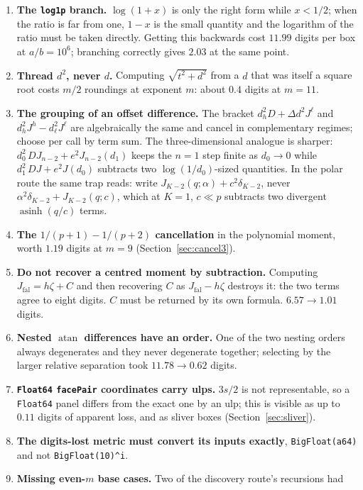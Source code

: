 \documentclass[11pt]{article}
\theoremstyle{remark}
\newcommand{\asinh}{\operatorname{asinh}}
\newcommand{\atan}{\operatorname{atan}}
\newcommand{\code}[1]{\texttt{#1}}
\begin{document}
\begin{enumerate}[nosep]
\item \textbf{The \code{log1p} branch.} $\log(1+x)$ is only the right form while
$x < 1/2$; when the ratio is far from one, $1-x$ is the small quantity and the logarithm
of the ratio must be taken directly. Getting this backwards cost $11.99$ digits per box at
$a/b = 10^6$; branching correctly gives $2.03$ at the same point.
\item \textbf{Thread $d^2$, never $d$.} Computing $\sqrt{t^2+d^2}$ from a $d$ that was
itself a square root costs $m/2$ roundings at exponent $m$: about $0.4$ digits at
$m = 11$.
\item \textbf{The grouping of an offset difference.} The bracket
$d_h^2 D + \Delta d^2 J^{\ell}$ and $d_h^2 J^h - d_\ell^2 J^{\ell}$ are algebraically the
same and cancel in complementary regimes; choose per call by term sum. The
three-dimensional analogue is sharper: $d_0^2\,DJ_{n-2} + e^2 J_{n-2}(d_1)$ keeps the
$n = 1$ step finite as $d_0\to0$ while $d_1^2\,DJ + e^2 J(d_0)$ subtracts two
$\log(1/d_0)$-sized quantities. In the polar route the same trap reads: write
$J_{K-2}(q;\alpha) + c^2\delta_{K-2}$, never $\alpha^2\delta_{K-2} + J_{K-2}(q;c)$, which
at $K = 1$, $c \ll p$ subtracts two divergent $\asinh(q/c)$ terms.
\item \textbf{The $1/(p+1) - 1/(p+2)$ cancellation} in the polynomial moment, worth
$1.19$ digits at $m = 9$ (Section~\ref{sec:cancel3}).
\item \textbf{Do not recover a centred moment by subtraction.} Computing
$J_{\mathrm{fal}} = h\zeta + C$ and then recovering $C$ as $J_{\mathrm{fal}} - h\zeta$
destroys it: the two terms agree to eight digits. $C$ must be returned by its own formula.
$6.57 \to 1.01$ digits.
\item \textbf{Nested $\atan$ differences have an order.} One of the two nesting orders
always degenerates and they never degenerate together; selecting by the larger relative
separation took $11.78 \to 0.62$ digits.
\item \textbf{\code{Float64} \code{facePair} coordinates carry ulps.} $3s/2$ is not
representable, so a \code{Float64} panel differs from the exact one by an ulp; this is
visible as up to $0.11$ digits of apparent loss, and as sliver boxes
(Section~\ref{sec:sliver}).
\item \textbf{The digits-lost metric must convert its inputs exactly},
\code{BigFloat(a64)} and not \code{BigFloat(10)\^{}i}.
\item \textbf{Missing even-$m$ base cases.} Two of the discovery route's recursions had

\end{enumerate}
\end{document}

